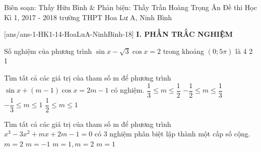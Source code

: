 
	\begin{name}
{Biên soạn: Thầy Hữu Bình \& Phản biện: Thầy Trần Hoàng Trọng Ân}
		{Đề thi Học Kì 1, 2017 - 2018 trường THPT Hoa Lư A, Ninh Bình}
	\end{name}
	\setcounter{ex}{0}\setcounter{bt}{0}
	[ans/ans-1-HK1-14-HoaLuA-NinhBinh-18]
\noindent\textbf{I. PHẦN TRẮC NGHIỆM}

\begin{ex}%
	Số nghiệm của phương trình $\sin x-\sqrt{3}\cos x=2$ trong khoảng $\left(0;5\pi\right)$ là
	\choice
	{}
	{4}
	{2}
	{1}
\end{ex}

\begin{ex}%
	Tìm tất cả các giá trị của tham số m để phương trình $\sin x+\left(m-1\right)\cos x=2m-1$ có nghiệm.
	\choice
	{$\dfrac{1}{3}\leqslant m\leqslant \dfrac{1}{2} $}
	{$-\dfrac{1}{2}\leqslant m\leqslant \dfrac{1}{3} $}
	{\True $-\dfrac{1}{3}\leqslant m\leqslant 1 $}
	{$\dfrac{1}{2}\leqslant m\leqslant 1 $}
\end{ex}

\begin{ex}%
	Tìm tất cả các giá trị của tham số m để phương trình $x^3-3x^2+mx+2m-1=0$ có 3 nghiệm phân biệt lập thành một cấp số cộng.
	\choice
	{$m=2 $}
	{$m=-1 $}
	{$m=1,m=2 $}
	{\True $m=1 $}
\end{ex}

